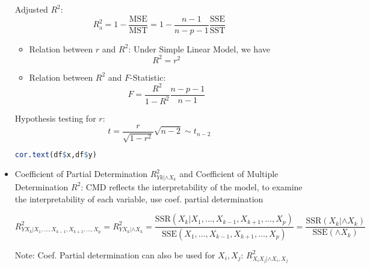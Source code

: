 \begin{itemize}[topsep=2pt,itemsep=2pt]
    Adjusted $ R^2 $:
    \begin{equation}
        R^2_\mathrm{a}=1-\dfrac{\mathrm{MSE}}{\mathrm{MST}} =1-\dfrac{n-1}{n-p-1}\dfrac{\mathrm{SSE}}{\mathrm{SST}}
    \end{equation}
    
    \begin{itemize}[topsep=2pt,itemsep=2pt]
        \item Relation between $ r $ and $ R^2 $: Under Simple Linear Model, we have 
        \begin{equation}
            R^2=r^2 
        \end{equation}
        \item Relation between $ R^2 $ and $ F $-Statistic:
        \begin{equation}
            F=\dfrac{R^2}{1-R^2}\dfrac{n-p-1}{n-1} 
        \end{equation}
    \end{itemize}

    Hypothesis testing for $ r $: 
    \begin{equation}
        t=\dfrac{r}{\sqrt{1-r^2}}\sqrt{n-2}\sim t_{n-2} 
    \end{equation}

\begin{rcode}
\begin{lstlisting}[language=R]
cor.text(df$x,df$y)
\end{lstlisting}
\end{rcode}
    


\item Coefficient of Partial Determination $ R^2_{Yk|\wedge X_k} $ and Coefficient of Multiple Determination $ R^2 $:
    CMD reflects the interpretability of the model, to examine the interpretability of each variable, use coef. partial determination

\begin{equation}
    R^2_{YX_k|X_1,\ldots,X_{k-1},X_{k+1},\ldots,X_p}=R^2_{YX_k|\wedge X_k}=\dfrac{\mathrm{SSR}(X_k|X_1,\ldots,X_{k-1},X_{k+1},\ldots,X_p) }{\mathrm{SSE}(X_1,\ldots,X_{k-1},X_{k+1},\ldots,X_p) }=\dfrac{\mathrm{SSR}(X_k|\wedge X_k) }{\mathrm{SSE}(\wedge X_k) }
\end{equation}

    Note: Coef. Partial determination can also be used for $ X_i,X_j $: $ R^2_{X_iX_j|\wedge X_i,X_j} $


\end{itemize}
